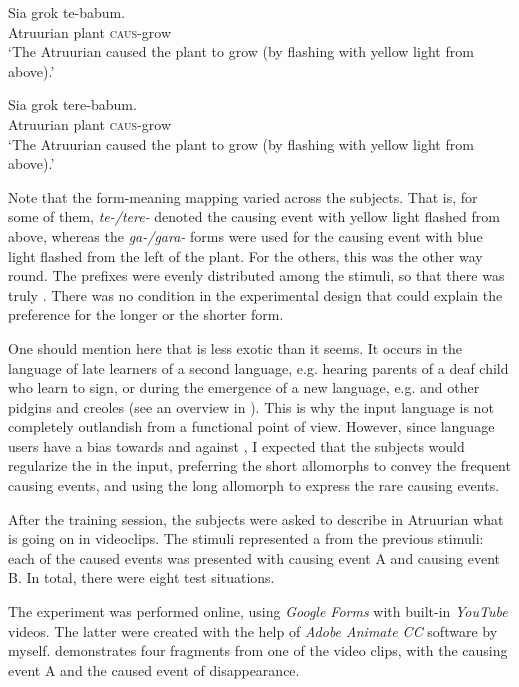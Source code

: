 \documentclass[output=paper]{langsci/langscibook}
\begin{document}
\ea
\ea
\gll  Sia    grok  te-babum.\\
       Atruurian   plant   \textsc{caus}{}-grow\\
\glt ‘The Atruurian caused the plant to grow (by flashing with yellow light from above).'

\ex
\gll  Sia    grok  tere-babum.\\
       Atruurian   plant   \textsc{caus}{}-grow\\
\glt ‘The Atruurian caused the plant to grow (by flashing with yellow light from above).'
\z
\z

Note that the form-meaning mapping varied across the subjects. That is, for some of them, \textit{te-/tere-} denoted the causing event with yellow light flashed from above, whereas the \textit{ga-/gara-} forms were used for the causing event with blue light flashed from the left of the plant. For the others, this was the other way round. The prefixes were evenly distributed among the stimuli, so that there was truly . There was no condition in the experimental design that could explain the preference for the longer or the shorter form.  

One should mention here that  is less exotic than it seems. It occurs in the language of late learners of a second language, e.g. hearing parents of a deaf child who learn to sign, or during the emergence of a new language, e.g.  and other pidgins and creoles (see an overview in \citealt{HudsonKamNewport2009}). This is why the input language is not completely outlandish from a functional point of view. However, since language users have a bias towards  and against , I expected that the subjects would regularize the  in the input, preferring the short allomorphs to convey the frequent causing events, and using the long allomorph to express the rare causing events.

After the training session, the subjects were asked to describe in Atruurian what is going on in videoclips. The stimuli represented a  from the previous stimuli: each of the caused events was presented with causing event A and causing event B. In total, there were eight test situations. 

The experiment was performed online, using \textit{Google Forms} with built-in \textit{YouTube} videos. The latter were created with the help of \textit{Adobe Animate CC} software by myself.  demonstrates four fragments from one of the video clips, with the causing event A and the caused event of disappearance.
\end{document}
